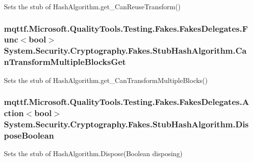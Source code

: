 Sets the stub of Hash\-Algorithm.\-get\-\_\-\-Can\-Reuse\-Transform()

\hypertarget{class_system_1_1_security_1_1_cryptography_1_1_fakes_1_1_stub_hash_algorithm_af12ba06283a1c92444d69c31fa80dfaa}{
\subsubsection[{Can\-Transform\-Multiple\-Blocks\-Get}]{\setlength{\rightskip}{0pt plus 5cm}mqttf.\-Microsoft.\-Quality\-Tools.\-Testing.\-Fakes.\-Fakes\-Delegates.\-Func$<$bool$>$ System.\-Security.\-Cryptography.\-Fakes.\-Stub\-Hash\-Algorithm.\-Can\-Transform\-Multiple\-Blocks\-Get}}\label{class_system_1_1_security_1_1_cryptography_1_1_fakes_1_1_stub_hash_algorithm_af12ba06283a1c92444d69c31fa80dfaa}


Sets the stub of Hash\-Algorithm.\-get\-\_\-\-Can\-Transform\-Multiple\-Blocks()

\hypertarget{class_system_1_1_security_1_1_cryptography_1_1_fakes_1_1_stub_hash_algorithm_ad7cc66b2ee6b7ecde03ac0282225986c}{
\subsubsection[{Dispose\-Boolean}]{\setlength{\rightskip}{0pt plus 5cm}mqttf.\-Microsoft.\-Quality\-Tools.\-Testing.\-Fakes.\-Fakes\-Delegates.\-Action$<$bool$>$ System.\-Security.\-Cryptography.\-Fakes.\-Stub\-Hash\-Algorithm.\-Dispose\-Boolean}}\label{class_system_1_1_security_1_1_cryptography_1_1_fakes_1_1_stub_hash_algorithm_ad7cc66b2ee6b7ecde03ac0282225986c}


Sets the stub of Hash\-Algorithm.\-Dispose(\-Boolean disposing)

